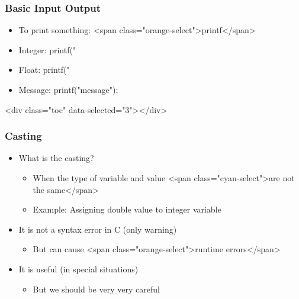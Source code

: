 \documentclass{../c-lecture}
\begin{document}
\begin{frame}
  \frametitle{Basic Input Output}
  \begin{itemize}
    \item To print something: <span class="orange-select">printf</span>
    \item Integer: printf("%
    \item Float: printf("%
    \item Message: printf("message");
  \end{itemize}
\end{frame}

\begin{frame}
  <div class="toc" data-selected="3"></div>
\end{frame}

\begin{frame}
  \frametitle{Casting}
  \begin{itemize}
    \item What is the casting?
    \begin{itemize}
      \item
        When the type of variable and value
        <span class="cyan-select">are not the same</span>
      \item Example: Assigning double value to integer variable
    \end{itemize}
    \item It is not a syntax error in C (only warning)
    \begin{itemize}
      \item But can cause <span class="orange-select">runtime errors</span>
    \end{itemize}
    \item It is useful (in special situations)
    \begin{itemize}
      \item But we should be very very careful
    \end{itemize}
  \end{itemize}
\end{frame}
\end{document}
